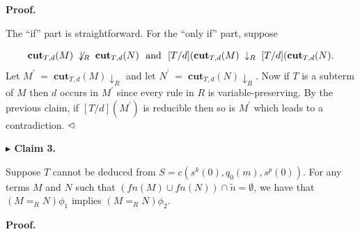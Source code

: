 \documentclass[10pt,a4paper]{amsart}
\begin{document}
 
 
 
 
\par\medskip\noindent\textbf{Proof.}\par
 
 
The “if” part is straightforward. For the “only if” part, suppose\par
    \[\mathbf{cut}_{T,d}(M)\;\not\downarrow_{R}\;\mathbf{cut}_{T,d}(N)\leavevmode%
\nobreak\ \text{ and }\leavevmode\nobreak\ [T/d](\mathbf{cut}_{T,d}(M)\;%
\downarrow_{R}\;[T/d](\mathbf{cut}_{T,d}(N).\]    
Let $M^{\prime}\;=\;\mathbf{cut}_{T,d}(M)\!\downarrow_{R}$ and let $N^{\prime}\;=\;\mathbf{cut}_{T,d}(N)\!\downarrow_{R}$. Now if $T$ is a subterm of $M$ then $d$ occurs in $M^{\prime}$ since every rule in $R$ is variable-preserving. By the previous claim, if $[T/d](M^{\prime})$ is reducible then so is $M^{\prime}$ which leads to a contradiction. $\hfill\vartriangleleft$\par
 
 
 
\par\medskip\noindent\textbf{$\blacktriangleright$ Claim 3.}\par
 
 
Suppose $T$ cannot be deduced from $S=c(s^{k}(0),q_{0}(m),s^{p}(0))$. For any terms $M$ and $N$ such that $(\mathit{fn}(M)\cup\mathit{fn}(N))\cap\tilde{n}=\emptyset$, we have that $(M=_{R}N)\phi_{1}$ implies $(M=_{R}N)\phi_{2}$.\par
 
 
 
 
 
\par\medskip\noindent\textbf{Proof.}\par
 
 
\end{document}
